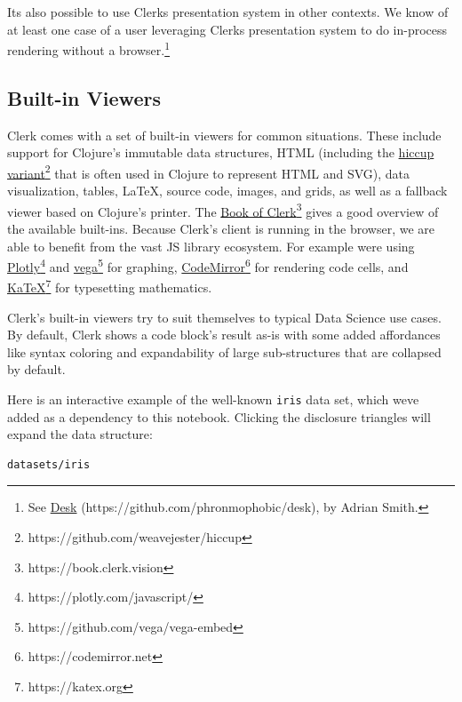 \documentclass[sigconf,screen,pbalance=true]{acmart}
\newcommand{\passthrough}[1]{#1}
\begin{document}
It\textquotesingle s also possible to use Clerk\textquotesingle s presentation system in other contexts. We know of at least one case of a user leveraging Clerk\textquotesingle s presentation system to do in-process rendering without a browser.\footnote{See {\href{https://github.com/phronmophobic/desk}{Desk} (https://github.com/phronmophobic/desk)}, by Adrian Smith.}

\hypertarget{built-in-viewers}{%
\subsection{Built-in Viewers}\label{built-in-viewers}}

Clerk comes with a set of built-in viewers for common situations. These include support for Clojure's immutable data structures, HTML (including the {\href{https://github.com/weavejester/hiccup}{hiccup variant}\footnote{https://github.com/weavejester/hiccup}} that is often used in Clojure to represent HTML and SVG), data visualization, tables, LaTeX, source code, images, and grids, as well as a fallback viewer based on Clojure's printer. The {\href{https://book.clerk.vision}{Book of Clerk}\footnote{https://book.clerk.vision}} gives a good overview of the available built-ins. Because Clerk's client is running in the browser, we are able to benefit from the vast JS library ecosystem. For example we\textquotesingle re using {\href{https://plotly.com/javascript/}{Plotly}\footnote{https://plotly.com/javascript/}} and {\href{https://github.com/vega/vega-embed}{vega}\footnote{https://github.com/vega/vega-embed}} for graphing, {\href{https://codemirror.net}{CodeMirror}\footnote{https://codemirror.net}} for rendering code cells, and {\href{https://katex.org}{KaTeX}\footnote{https://katex.org}} for typesetting mathematics.

Clerk's built-in viewers try to suit themselves to typical Data Science use cases. By default, Clerk shows a code block's result as-is with some added affordances like syntax coloring and expandability of large sub-structures that are collapsed by default.

Here is an interactive example of the well-known \passthrough{\lstinline!iris!} data set, which we\textquotesingle ve added as a dependency to this notebook. Clicking the disclosure triangles will expand the data structure:

\begin{minipage}{\linewidth}
\begin{lstlisting}
datasets/iris
\end{lstlisting}
\end{minipage}
\end{document}
